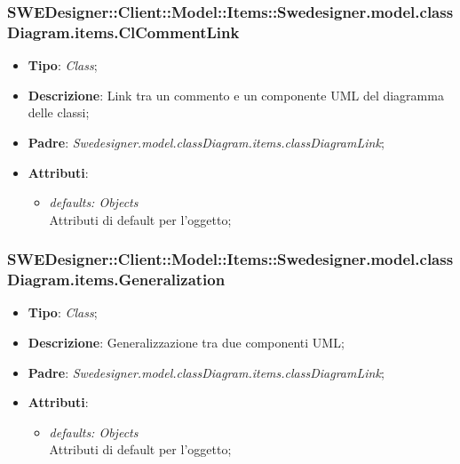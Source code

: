 \documentclass[../DefinizioneDiProdotto.tex]{subfiles}
\begin{document}
			\subsubsection{SWEDesigner::Client::Model::Items::Swedesigner.model.classDiagram.items.ClCommentLink}
			\hypertarget{SWEDesigner::Client::Model::Items::Swedesigner.model.classDiagram.items.ClCommentLink}{}
			\begin{itemize}
				\item \textbf{Tipo}: \emph{Class};
				\item \textbf{Descrizione}: Link tra un commento e un componente UML del diagramma delle classi;
				\item \textbf{Padre}: \emph{Swedesigner.model.classDiagram.items.classDiagramLink};
				\item \textbf{Attributi}:
				\begin{itemize}
					\item \emph{defaults: Objects}\\
					Attributi di default per l'oggetto;
				\end{itemize}
			\end{itemize}
			\subsubsection{SWEDesigner::Client::Model::Items::Swedesigner.model.classDiagram.items.Generalization}
			\hypertarget{SWEDesigner::Client::Model::Items::Swedesigner.model.classDiagram.items.Generalization}{}
			\begin{itemize}
				\item \textbf{Tipo}: \emph{Class};
				\item \textbf{Descrizione}: Generalizzazione tra due componenti UML;
				\item \textbf{Padre}: \emph{Swedesigner.model.classDiagram.items.classDiagramLink};
				\item \textbf{Attributi}:
				\begin{itemize}
					\item \emph{defaults: Objects}\\
					Attributi di default per l'oggetto;
				\end{itemize}
			\end{itemize}
\end{document}
